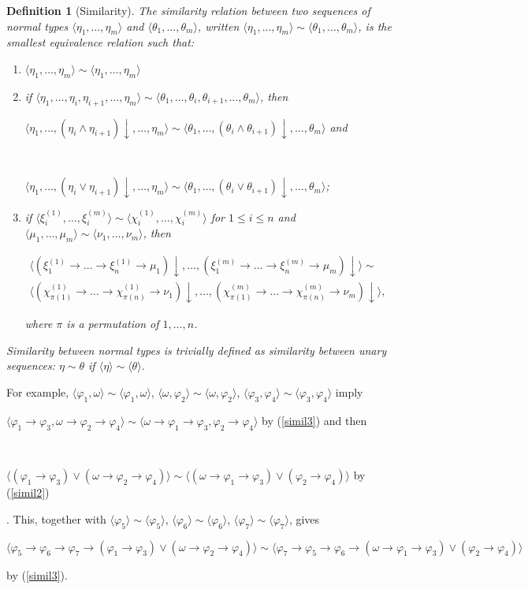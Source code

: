 \documentclass[UKenglish]{eptcs}
\newtheorem{definition}[fact]{Definition}
\newcommand{\tM}{\mu}
\newcommand{\tN}{\nu}
\newcommand{\te}{\xi}
\newcommand{\ti}{\chi}
\newcommand{\tu}{\omega}
\newcommand{\tQ}{\eta}
\newcommand{\tY}{\theta}
\newcommand{\seq}[2]{\langle#1,\ldots,#2\rangle}
\newcommand{\seqs}[1]{\langle#1\rangle}
\newcommand{\tsi}{\sim}
\newcommand{\labelx}[1]{\label{#1}}
\newcommand{\nf}[1]{#1\!\!\downarrow}
\newcommand{\myformula}[1]{\\[0.5pt]\centerline{#1}}
\begin{document}
\begin{definition}[Similarity]\labelx{simil}
The {\em similarity} relation between two sequences of normal types $\seq{\tQ_1}{\tQ_m}$ and $\seq{\tY_1}{\tY_m}$, written $\seq{\tQ_1}{\tQ_m}\tsi \seq{\tY_1}{\tY_m}$,
is the smallest equivalence relation such that:
\begin{enumerate}
\item\labelx{simil1} $\seq{\tQ_1}{\tQ_m} \tsi \seq{\tQ_1}{\tQ_m}$ \item\labelx{simil2} if $\langle{\tQ_1},\ldots,\tQ_i,\tQ_{i+1},\ldots,{\tQ_m}\rangle\tsi \langle{\tY_1},\ldots,\tY_i,\tY_{i+1},\ldots,{\tY_m}\rangle$, then
\myformula{
$\langle{\tQ_1},\ldots,\nf{(\tQ_i\wedge\tQ_{i+1})},\ldots,{\tQ_m}\rangle\tsi \langle{\tY_1},\ldots,\nf{(\tY_i\wedge\tY_{i+1})},\ldots,{\tY_m}\rangle$ and}
\myformula{$\langle{\tQ_1},\ldots,\nf{(\tQ_i\vee\tQ_{i+1})},\ldots,{\tQ_m}\rangle\tsi \langle{\tY_1},\ldots,\nf{(\tY_i\vee\tY_{i+1})},\ldots,{\tY_m}\rangle$;}
\item\labelx{simil3} if $\seq{\te^{(1)}_i}{\te^{(m)}_i} \tsi \seq{\ti^{(1)}_i}{\ti^{(m)}_i}$ for $1\leq i\leq n$ and $\seq{\tM_1}{\tM_m}\tsi\seq{\tN_1}{\tN_m}$, then
\myformula{$\begin{array}{l}\seq{\nf{(\te^{(1)}_1 \to \ldots \to \te^{(1)}_n\to \tM_1)}}{\nf{(\te^{(m)}_1 \to \ldots \to \te^{(m)}_n\to \tM_m)}}\tsi\\[2pt] \seq{\nf{(\ti^{(1)}_{\pi(1)} \to \ldots \to \ti^{(1)}_{\pi(n)}\to \tN_1)}}{\nf{(\ti^{(m)}_{\pi(1)} \to \ldots \to \ti^{(m)}_{\pi(n)}\to \tN_m)}},\end{array}$}
where $\pi$ is a permutation of $1,\dots, n$.
\end{enumerate}
\emph{Similarity between normal types} is trivially defined as similarity between unary sequences:
$\tQ\tsi\tY$ if $\seqs\tQ\tsi\seqs\tY$.
\end{definition}
 \noindent
 For example, $ \seqs{\varphi_1,\tu}\tsi\seqs{\varphi_1,\tu}$, $ \seqs{\tu,\varphi_2}\tsi\seqs{\tu,\varphi_2}$, $ \seqs{\varphi_3,\varphi_4}\tsi\seqs{\varphi_3,\varphi_4}$ imply
 \myformula{$ \seqs{\varphi_1\to\varphi_3,\tu\to\varphi_2\to\varphi_4}\tsi\seqs{\tu\to\varphi_1\to\varphi_3,\varphi_2\to\varphi_4}$ by (\ref{simil3}) and then }
 \myformula{$ \seqs{(\varphi_1\to\varphi_3)\vee(\tu\to\varphi_2\to\varphi_4)}\tsi\seqs{(\tu\to\varphi_1\to\varphi_3)\vee(\varphi_2\to\varphi_4)}$ by (\ref{simil2})}. This, together with  $\seqs{\varphi_5}\tsi\seqs{\varphi_5}$,   $\seqs{\varphi_6}\tsi\seqs{\varphi_6}$, $\seqs{\varphi_7}\tsi\seqs{\varphi_7}$, gives \myformula{$ \seqs{\varphi_5\to\varphi_6\to\varphi_7\to(\varphi_1\to\varphi_3)\vee(\tu\to\varphi_2\to\varphi_4)}\tsi\seqs{\varphi_7\to\varphi_5\to\varphi_6\to(\tu\to\varphi_1\to\varphi_3)\vee(\varphi_2\to\varphi_4)}$} by  (\ref{simil3}).
\end{document}
